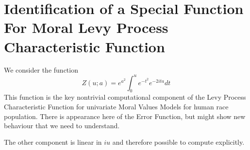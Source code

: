 \documentclass{amsart}
\begin{document}
\section{Identification of a Special Function For Moral Levy Process Characteristic Function}
We consider the function
\begin{equation}
Z(u; a) = e^{a^2}\int_0^u e^{-t^2} e^{-2it a} dt
\end{equation}
This function is the key nontrivial computational component of the Levy Process Characteristic Function for univariate Moral Values Models for human race population.  There is appearance here of the Error Function, but might show new behaviour that we need to understand.

The other component is linear in $iu$ and therefore possible to compute explicitly.
\end{document}
